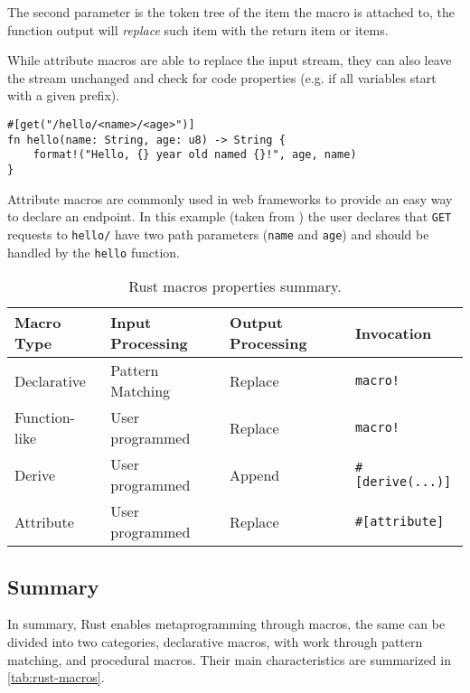 The second parameter is the token tree of the item the macro is attached to,
the function output will \emph{replace} such item with the return item or items.

While attribute macros are able to replace the input stream,
they can also leave the stream unchanged and check for code properties (e.g. if all variables start with a given prefix).

\begin{listing}
    \centering
    \begin{verbatim}
#[get("/hello/<name>/<age>")]
fn hello(name: String, age: u8) -> String {
    format!("Hello, {} year old named {}!", age, name)
}
    \end{verbatim}
    \caption{
        Attribute macros are commonly used in web frameworks to provide an easy way to declare an endpoint.
        In this example (taken from \autocite{Rocket2021}) the user declares that \texttt{GET} requests to \texttt{hello/}
        have two path parameters (\texttt{name} and \texttt{age}) and should be handled by the \texttt{hello} function.
    }
    \label{lst:rust-rocket-attr}
\end{listing}

\begin{table}
    \centering
    \begin{tabular}{l|l|l|l}
        Macro Type    & Input Processing & Output Processing & Invocation                 \\
        \hline
        Declarative   & Pattern Matching & Replace           & \texttt{macro!}            \\
        Function-like & User programmed  & Replace           & \texttt{macro!}            \\
        Derive        & User programmed  & Append            & \texttt{\#{[}derive(...)]} \\
        Attribute     & User programmed  & Replace           & \texttt{\#{[}attribute]}
    \end{tabular}
    \caption{Rust macros properties summary.}
    \label{tab:rust-macros}
\end{table}

\subsection{Summary}
In summary, Rust enables metaprogramming through macros, the same can be divided into two categories,
declarative macros, with work through pattern matching, and procedural macros.
Their main characteristics are summarized in \autoref{tab:rust-macros}.

